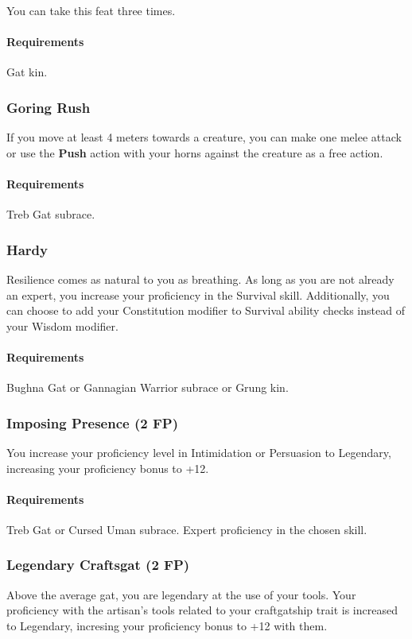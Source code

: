         You can take this feat three times.
        \paragraph{Requirements} Gat kin.
    \subsubsection{Goring Rush} \label{feat::goringrush}
        If you move at least 4 meters towards a creature, you can make one melee attack or use the \textbf{Push} action with your horns against the creature as a free action.
        \paragraph{Requirements} Treb Gat subrace.
    \subsubsection{Hardy} \label{feat::hardy}
        Resilience comes as natural to you as breathing.
        As long as you are not already an expert, you increase your proficiency in the Survival skill.
        Additionally, you can choose to add your Constitution modifier to Survival ability checks instead of your Wisdom modifier.
        \paragraph{Requirements} Bughna Gat or Gannagian Warrior subrace or Grung kin.
    \subsubsection{Imposing Presence (2 FP)} \label{feat::imposingpresence}
        You increase your proficiency level in Intimidation or Persuasion to Legendary, increasing your proficiency bonus to +12.
        \paragraph{Requirements} Treb Gat or Cursed Uman subrace. Expert proficiency in the chosen skill.
    \subsubsection{Legendary Craftsgat (2 FP)} \label{feat::legendarycraftsgat}
        Above the average gat, you are legendary at the use of your tools.
        Your proficiency with the artisan's tools related to your craftgatship trait is increased to Legendary, incresing your proficiency bonus to +12 with them.
